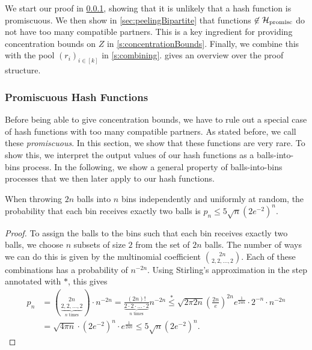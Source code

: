 \documentclass[a4paper,USenglish,cleveref]{lipics-v2021}
\begin{document}
We start our proof in \cref{s:promiscuous}, showing that it is unlikely that a hash function is promiscuous.
We then show in \cref{sec:peelingBipartite} that functions $\not\in\mathcal{H}_{\textrm{promisc}}$ do not have too many compatible partners.
This is a key ingredient for providing concentration bounds on $Z$ in \cref{s:concentrationBounds}.
Finally, we combine this with the pool $(r_i)_{i\in[k]}$ in \cref{s:combining}.
 gives an overview over the proof structure.

\def\constantMaxC{c_1}
\def\constantD{c_2}
\def\constantZHat{c_3}
\def\constantZ{c_4}

\begin{figure}[omitted: a diagram of this paper's results, not reproduced here]\label{fig:proofStructure}\end{figure}

\subsubsection{Promiscuous Hash Functions}\label{s:promiscuous}
Before being able to give concentration bounds, we have to rule out a special case of hash functions with too many compatible partners.
As stated before, we call these \emph{promiscuous}.
In this section, we show that these functions are very rare.
To show this, we interpret the output values of our hash functions as a balls-into-bins process.
In the following, we show a general property of balls-into-bins processes that we then later apply to our hash functions.

\begin{lemma}
  When throwing $2n$ balls into $n$ bins independently and uniformly at random, the probability that each bin receives exactly two balls is $p_n \leq 5 \sqrt{n}(2e^{-2})^n$.
  \label{lem:perfectBallsBins}
\end{lemma}
\begin{proof}
  To assign the balls to the bins such that each bin receives exactly two balls, we choose $n$ subsets of size $2$ from the set of $2n$ balls.
  The number of ways we can do this is given by the multinomial coefficient ${2n \choose {2,2,\ldots,2}}$.
  Each of these combinations has a probability of $n^{-2n}$.
  Using Stirling's approximation in the step annotated with $*$, this gives
  \begin{align*}
    p_n
      &= {2n \choose \underbrace{2,2,\ldots,2}_\textrm{$n$ times}} \cdot n^{-2n}
       = \frac{(2n)!}{\underbrace{2 \cdot 2 \cdot \ldots \cdot 2}_\textrm{$n$ times}}n^{-2n}
       \overset{*}{\leq} \sqrt{2\pi 2n}\left(\frac{2n}{e}\right)^{2n}e^{\frac{1}{24n}}\cdot 2^{-n} \cdot n^{-2n}\\
      &=\sqrt{4\pi n} \cdot (2e^{-2})^n \cdot e^{\frac{1}{24n}}
      \leq 5 \sqrt{n}(2e^{-2})^n.
    \tag*{\qedhere}
  \end{align*}
\end{proof}
\end{document}
